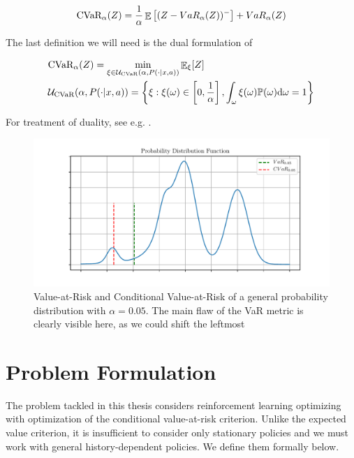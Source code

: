 \begin{equation}
\text{CVaR}_\alpha(Z)= \dfrac{1}{\alpha}\mathop{\mathbb{E}} \left[ (Z-VaR_\alpha(Z))^-\right] + VaR_\alpha(Z)
\end{equation}

The last definition we will need is the dual formulation of 

\begin{align}\label{eqn:prelim:cvardual}
&\text{CVaR}_\alpha(Z)= \min_{\xi \in \mathcal{U}_{\text{CVaR}}(\alpha, P(\cdot | x, a))}\mathop{\mathbb{E}}\nolimits_\xi[Z]\\
&\mathcal{U}_{\text{CVaR}}(\alpha, P(\cdot | x, a)) = \left\{ {\xi : \xi(\omega) \in \left[ {0, \frac{1}{\alpha}} \right], \int_{\omega} \xi(\omega)\mathbb{P}(\omega) \text{d}\omega = 1} \right\}
\end{align}


For treatment of duality, see e.g. \citet{boyd2004convex}.

\begin{figure}
\center
\includegraphics[width=\linewidth]{gfx/pdf.pdf}
\caption{Value-at-Risk and Conditional Value-at-Risk of a general probability distribution with $\alpha=0.05$. The main flaw of the VaR metric is clearly visible here, as we could shift the leftmost }
\end{figure}





\section{Problem Formulation}\label{sec:prelim:problem}

The problem tackled in this thesis considers reinforcement learning optimizing with optimization of the conditional value-at-risk criterion. Unlike the expected value criterion, it is insufficient to consider only stationary policies and we must work with general history-dependent policies. We define them formally below.

